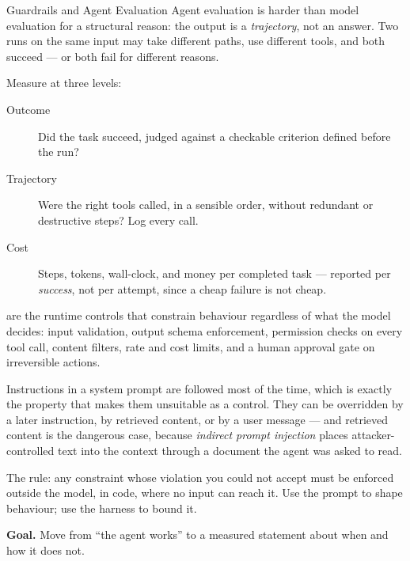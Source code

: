 \begin{v3topic}{Guardrails and Agent Evaluation}
    Agent evaluation is harder than model evaluation for a structural reason:
    the output is a \emph{trajectory}, not an answer. Two runs on the same
    input may take different paths, use different tools, and both succeed ---
    or both fail for different reasons.

    Measure at three levels:
    \begin{description}
      \item[Outcome] Did the task succeed, judged against a checkable
        criterion defined before the run?
      \item[Trajectory] Were the right tools called, in a sensible order,
        without redundant or destructive steps? Log every call.
      \item[Cost] Steps, tokens, wall-clock, and money per completed task ---
        reported per \emph{success}, not per attempt, since a cheap failure is
        not cheap.
    \end{description}

     are the runtime controls that constrain behaviour
    regardless of what the model decides: input validation, output schema
    enforcement, permission checks on every tool call, content filters,
    rate and cost limits, and a human approval gate on irreversible actions.

\begin{cautionbox}
Instructions in a system prompt are followed most of the time, which is
exactly the property that makes them unsuitable as a control. They can be
overridden by a later instruction, by retrieved content, or by a user message
--- and retrieved content is the dangerous case, because \emph{indirect prompt
injection} places attacker-controlled text into the context through a document
the agent was asked to read.

The rule: any constraint whose violation you could not accept must be enforced
outside the model, in code, where no input can reach it. Use the prompt to
shape behaviour; use the harness to bound it.
\end{cautionbox}

\begin{practicallab}
\textbf{Goal.} Move from ``the agent works'' to a measured statement about
when and how it does not.


\end{practicallab}
\end{v3topic}
